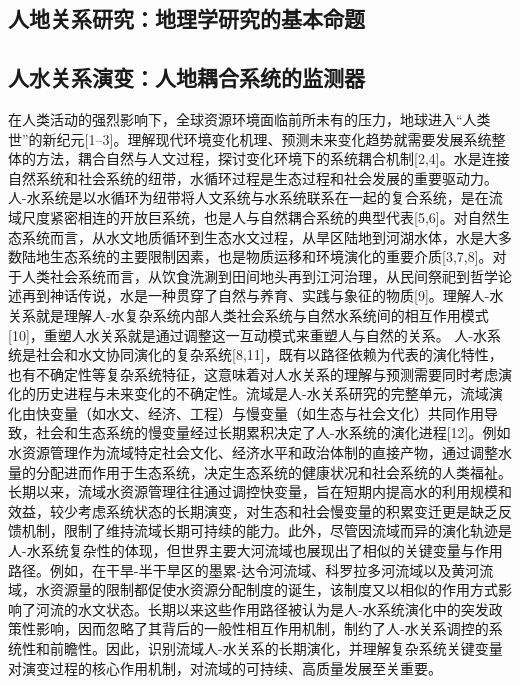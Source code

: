 
\subsection{人地关系研究：地理学研究的基本命题}

\subsection{人水关系演变：人地耦合系统的监测器}

在人类活动的强烈影响下，全球资源环境面临前所未有的压力，地球进入“人类世”的新纪元[1–3]。理解现代环境变化机理、预测未来变化趋势就需要发展系统整体的方法，耦合自然与人文过程，探讨变化环境下的系统耦合机制[2,4]。水是连接自然系统和社会系统的纽带，水循环过程是生态过程和社会发展的重要驱动力。人-水系统是以水循环为纽带将人文系统与水系统联系在一起的复合系统，是在流域尺度紧密相连的开放巨系统，也是人与自然耦合系统的典型代表[5,6]。对自然生态系统而言，从水文地质循环到生态水文过程，从旱区陆地到河湖水体，水是大多数陆地生态系统的主要限制因素，也是物质运移和环境演化的重要介质[3,7,8]。对于人类社会系统而言，从饮食洗涮到田间地头再到江河治理，从民间祭祀到哲学论述再到神话传说，水是一种贯穿了自然与养育、实践与象征的物质[9]。理解人-水关系就是理解人-水复杂系统内部人类社会系统与自然水系统间的相互作用模式[10]，重塑人水关系就是通过调整这一互动模式来重塑人与自然的关系。
人-水系统是社会和水文协同演化的复杂系统[8,11]，既有以路径依赖为代表的演化特性，也有不确定性等复杂系统特征，这意味着对人水关系的理解与预测需要同时考虑演化的历史进程与未来变化的不确定性。流域是人-水关系研究的完整单元，流域演化由快变量（如水文、经济、工程）与慢变量（如生态与社会文化）共同作用导致，社会和生态系统的慢变量经过长期累积决定了人-水系统的演化进程[12]。例如水资源管理作为流域特定社会文化、经济水平和政治体制的直接产物，通过调整水量的分配进而作用于生态系统，决定生态系统的健康状况和社会系统的人类福祉。长期以来，流域水资源管理往往通过调控快变量，旨在短期内提高水的利用规模和效益，较少考虑系统状态的长期演变，对生态和社会慢变量的积累变迁更是缺乏反馈机制，限制了维持流域长期可持续的能力。此外，尽管因流域而异的演化轨迹是人-水系统复杂性的体现，但世界主要大河流域也展现出了相似的关键变量与作用路径。例如，在干旱-半干旱区的墨累-达令河流域、科罗拉多河流域以及黄河流域，水资源量的限制都促使水资源分配制度的诞生，该制度又以相似的作用方式影响了河流的水文状态。长期以来这些作用路径被认为是人-水系统演化中的突发政策性影响，因而忽略了其背后的一般性相互作用机制，制约了人-水关系调控的系统性和前瞻性。因此，识别流域人-水关系的长期演化，并理解复杂系统关键变量对演变过程的核心作用机制，对流域的可持续、高质量发展至关重要。



